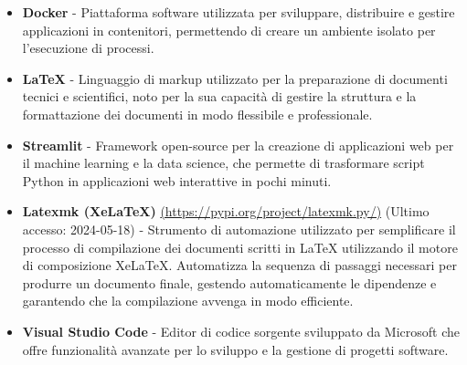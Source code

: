 \begin{itemize}
    \item \textbf{Docker} - Piattaforma software utilizzata per sviluppare, distribuire e gestire applicazioni in contenitori, permettendo di creare un ambiente isolato per l'esecuzione di processi.
    
    \item \textbf{LaTeX} - Linguaggio di markup utilizzato per la preparazione di documenti tecnici e scientifici, noto per la sua capacità di gestire la struttura e la formattazione dei documenti in modo flessibile e professionale.
    
    \item \textbf{Streamlit} - Framework open-source per la creazione di applicazioni web per il machine learning e la data science, che permette di trasformare script Python in applicazioni web interattive in pochi minuti.
    
    \item \textbf{Latexmk (XeLaTeX)} \href{https://pypi.org/project/latexmk.py/}{(https://pypi.org/project/latexmk.py/)} (Ultimo accesso: 2024-05-18) - Strumento di automazione utilizzato per semplificare il processo di compilazione dei documenti scritti in LaTeX utilizzando il motore di composizione XeLaTeX. Automatizza la sequenza di passaggi necessari per produrre un documento finale, gestendo automaticamente le dipendenze e garantendo che la compilazione avvenga in modo efficiente.
    
    \item \textbf{Visual Studio Code} - Editor di codice sorgente sviluppato da Microsoft che offre funzionalità avanzate per lo sviluppo e la gestione di progetti software.
\end{itemize}
